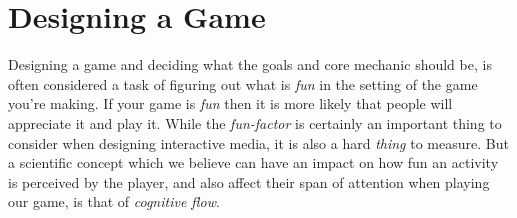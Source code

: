 \section{Designing a Game}
Designing a game and deciding what the goals and core mechanic should be, is often considered a task of figuring out
what is \emph{fun} in the setting of the game you're making.  If your game is \emph{fun} then it is more likely that
people will appreciate it and play it.
While the \textit{fun-factor} is certainly an important thing to consider when designing interactive media, it is also
a hard \textit{thing} to measure. But a scientific concept which we believe can have an impact on how fun an activity
is perceived by the player, and also affect their span of attention when playing our game, is that of \textit{cognitive
flow}.


